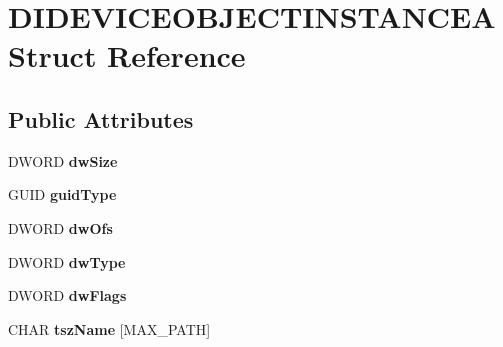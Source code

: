 \hypertarget{struct_d_i_d_e_v_i_c_e_o_b_j_e_c_t_i_n_s_t_a_n_c_e_a}{\section{D\-I\-D\-E\-V\-I\-C\-E\-O\-B\-J\-E\-C\-T\-I\-N\-S\-T\-A\-N\-C\-E\-A Struct Reference}
\label{struct_d_i_d_e_v_i_c_e_o_b_j_e_c_t_i_n_s_t_a_n_c_e_a}
}
\subsection*{Public Attributes}
\begin{DoxyCompactItemize}
\item 
\hypertarget{struct_d_i_d_e_v_i_c_e_o_b_j_e_c_t_i_n_s_t_a_n_c_e_a_a0d55894b80f8e6ec487e7e7aa6f71254}{D\-W\-O\-R\-D {\bfseries dw\-Size}}\label{struct_d_i_d_e_v_i_c_e_o_b_j_e_c_t_i_n_s_t_a_n_c_e_a_a0d55894b80f8e6ec487e7e7aa6f71254}

\item 
\hypertarget{struct_d_i_d_e_v_i_c_e_o_b_j_e_c_t_i_n_s_t_a_n_c_e_a_a670f89173fa4625ce5e57278050a887f}{G\-U\-I\-D {\bfseries guid\-Type}}\label{struct_d_i_d_e_v_i_c_e_o_b_j_e_c_t_i_n_s_t_a_n_c_e_a_a670f89173fa4625ce5e57278050a887f}

\item 
\hypertarget{struct_d_i_d_e_v_i_c_e_o_b_j_e_c_t_i_n_s_t_a_n_c_e_a_a16bb7716c0c959f048226ea0b8c190bd}{D\-W\-O\-R\-D {\bfseries dw\-Ofs}}\label{struct_d_i_d_e_v_i_c_e_o_b_j_e_c_t_i_n_s_t_a_n_c_e_a_a16bb7716c0c959f048226ea0b8c190bd}

\item 
\hypertarget{struct_d_i_d_e_v_i_c_e_o_b_j_e_c_t_i_n_s_t_a_n_c_e_a_abbd0ecf057054a822de3174c511c5fd1}{D\-W\-O\-R\-D {\bfseries dw\-Type}}\label{struct_d_i_d_e_v_i_c_e_o_b_j_e_c_t_i_n_s_t_a_n_c_e_a_abbd0ecf057054a822de3174c511c5fd1}

\item 
\hypertarget{struct_d_i_d_e_v_i_c_e_o_b_j_e_c_t_i_n_s_t_a_n_c_e_a_a1ecf2634b90d68931f9790e84ef1cb5f}{D\-W\-O\-R\-D {\bfseries dw\-Flags}}\label{struct_d_i_d_e_v_i_c_e_o_b_j_e_c_t_i_n_s_t_a_n_c_e_a_a1ecf2634b90d68931f9790e84ef1cb5f}

\item 
\hypertarget{struct_d_i_d_e_v_i_c_e_o_b_j_e_c_t_i_n_s_t_a_n_c_e_a_aec932f05a7ebb2b5cba0503424626aae}{C\-H\-A\-R {\bfseries tsz\-Name} \mbox{[}M\-A\-X\-\_\-\-P\-A\-T\-H\mbox{]}}\label{struct_d_i_d_e_v_i_c_e_o_b_j_e_c_t_i_n_s_t_a_n_c_e_a_aec932f05a7ebb2b5cba0503424626aae}


\end{DoxyCompactItemize}
